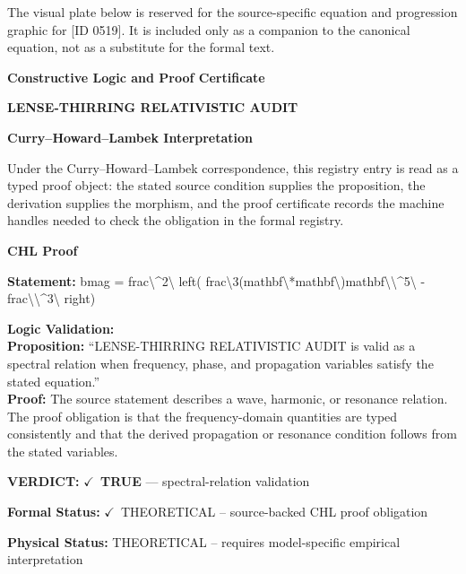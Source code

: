 \begingroup\footnotesize\sloppy
The visual plate below is reserved for the source-specific equation and progression graphic for [ID 0519]. It is included only as a companion to the canonical equation, not as a substitute for the formal text.
\par\endgroup
\ifTZPDarkEdition
{}
\fi

\clearpage
\begingroup\tzpsupportsetup
\noindent\textbf{\fontsize{10.8pt}{12.8pt}\selectfont [ID 0519] Constructive Logic and Proof Certificate}\par
\noindent\textbf{\fontsize{10pt}{12pt}\selectfont LENSE-THIRRING RELATIVISTIC AUDIT}\par
\vspace{0.45em}
\begingroup
\footnotesize
\setlength{\parskip}{0.22em}
\setlength{\parindent}{0pt}
\noindent\textbf{Curry--Howard--Lambek Interpretation}\par
Under the Curry--Howard--Lambek correspondence, this registry entry is read as a typed proof
object: the stated source condition supplies the proposition, the derivation supplies the
morphism, and the proof certificate records the machine handles needed to check the obligation
in the formal registry.

\vspace{0.45em}
\noindent\textbf{CHL Proof}\par
\textbf{Statement:} bmag = frac\textbackslash{}\textasciicircum{}2\textbackslash{} left( frac\textbackslash{}3(mathbf\textbackslash{}*mathbf\textbackslash{})mathbf\textbackslash{}\textbackslash{}\textasciicircum{}5\textbackslash{} - frac\textbackslash{}\textbackslash{}\textasciicircum{}3\textbackslash{} right)

\textbf{Logic Validation:}\\
\textbf{Proposition:} ``LENSE-THIRRING RELATIVISTIC AUDIT is valid as a spectral relation when frequency, phase,
and propagation variables satisfy the stated equation.''\\
\textbf{Proof:} The source statement describes a wave, harmonic, or resonance relation. The proof
obligation is that the frequency-domain quantities are typed consistently and that the
derived propagation or resonance condition follows from the stated variables.

\textbf{VERDICT:} \ensuremath{\checkmark}\ \textbf{TRUE} --- spectral-relation validation

\textbf{Formal Status:} \ensuremath{\checkmark}\ THEORETICAL -- source-backed CHL proof obligation

\textbf{Physical Status:} THEORETICAL -- requires model-specific empirical interpretation
\par\vspace{0.45em}
\par
\ifTZPDarkEdition
{}
\fi
\endgroup
\endgroup
